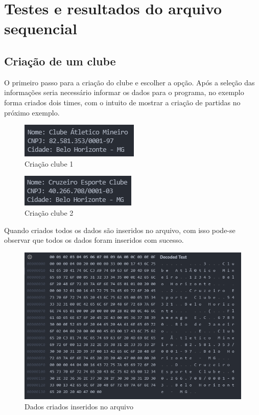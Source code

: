 \documentclass[12pt]{article}
\begin{document}
\section{Testes e resultados do arquivo sequencial}
\subsection{Criação de um clube}
O primeiro passo para a criação do clube e escolher a opção. Após a seleção das informações seria necessário informar os dados para o programa, no exemplo forma criados dois times, com o intuito de mostrar a criação de partidas no próximo exemplo.

\newpage
\begin{figure}[ht]
\centering
\includegraphics[width=.4\textwidth]{create_dados.png}
\caption{Criação clube 1}
\label{fig:create1}
\end{figure}

\begin{figure}[ht]
\centering
\includegraphics[width=.4\textwidth]{create_dados2.png}
\caption{Criação clube 2}
\label{fig:create2}
\end{figure}

Quando criados todos os dados são inseridos no arquivo, com isso pode-se observar que todos os dados foram inseridos com sucesso.

\begin{figure}[ht]
\centering
\includegraphics[width=.6\textwidth]{create_no_arquivo.png}
\caption{Dados criados inseridos no arquivo}
\label{fig:create_sucess}
\end{figure}
\end{document}
